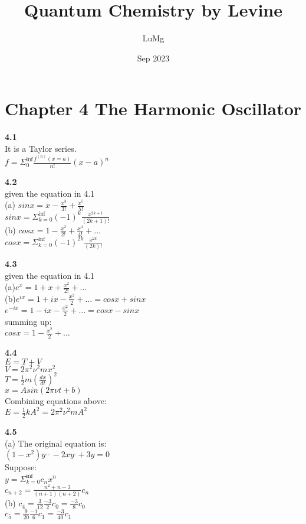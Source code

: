 \documentclass{article}
\title{Quantum Chemistry by Levine}
\author{LuMg}
\date{Sep 2023}
\begin{document}
\maketitle

\section{Chapter 4 The Harmonic Oscillator}
\textbf{4.1}\\
It is a Taylor series.\\
$f = \Sigma_0^{\inf}\frac{f^{(n)}(x = a)}{n!}(x-a)^n$\\
\newline

\textbf{4.2}\\
given the equation in 4.1\\
(a) $sinx = x - \frac{x^3}{3!} + \frac{x^5}{5!}$\\
$sinx = \Sigma_{k=0}^{\inf}(-1)^k\frac{x^{2k+1}}{(2k+1)!}$\\
(b) $cosx = 1 - \frac{x^2}{2!} + \frac{x^4}{4!}+\dots$\\
$cosx = \Sigma_{k = 0}^{\inf}(-1)^{2k}\frac{x^{2k}}{(2k)!}$\\
\newline

\textbf{4.3}\\
given the equation in 4.1\\
(a)$e^x = 1 + x + \frac{x^2}{2!} + \dots$\\
(b)$e^{ix} = 1 + ix - \frac{x^2}{2} + \dots = cos x + sinx$\\
$e^{-ix} = 1 -ix - \frac{x^2}{2} + \dots = cosx -sinx$\\
summing up:\\
$cosx = 1 - \frac{x^2}{2} + \dots$\\
\newline

\textbf{4.4}\\
$E = T+ V$\\
$V = 2\pi^2\nu^2mx^2$\\
$T = \frac{1}{2}m(\frac{dx}{dt})^2$\\
$x = Asin(2\pi\nu t+b)$\\
Combining equations above:\\
$E = \frac{1}{2}kA^2 = 2\pi^2\nu^2mA^2$\\
\newline

\textbf{4.5}\\
(a) The original equation is:\\
$(1-x^2)y^{,,} - 2xy^,+3y = 0$\\
Suppose:\\
$y = \Sigma_{k = 0}^{\inf}c_nx^n$\\
$c_{n+2} = \frac{n^2 + n - 3}{(n + 1)(n + 2)}c_n$\\
(b) $c_4 = \frac{3}{12}\frac{-3}{2}c_0 = \frac{-3}{8}c_0$\\
$c_5 = \frac{9}{20}\frac{-1}{6}c_1 = \frac{-3}{40}c_1$\\
\newline
\end{document}
